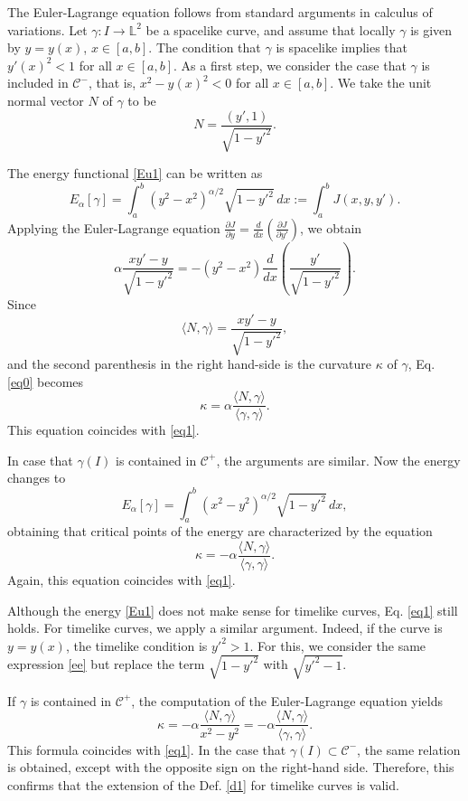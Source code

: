 \documentclass[a4paper,12pt]{amsart}
\theoremstyle{definition}
\def\l{\mathbb L}
\begin{document}
The Euler-Lagrange equation follows from standard arguments in calculus of variations.  Let $\gamma\colon I\to\l^2$ be a spacelike curve, and assume that locally  $\gamma$ is given by $y=y(x)$, $x\in [a,b]$. The condition that $\gamma$ is spacelike implies that $y'(x)^2<1$ for all $x\in [a,b]$. As a first step, we consider the case that $\gamma$ is included in $\mathcal{C}^-$, that is,  $x^2-y(x)^2 <0$ for all $x\in [a,b]$. We take the unit normal vector   $N$ of $\gamma$ to be
\begin{equation}\label{n}
N=\frac{(y',1)}{\sqrt{1-y'^2}}.
\end{equation} 

The energy functional \eqref{Eu1} can be written as
\begin{equation}\label{ee}
E_\alpha[\gamma]=\int_a^b (y^2-x^2)^{\alpha/2}\sqrt{1-y'^2}\, dx:=\int_a^b  J(x,y,y').
\end{equation}
Applying the  Euler-Lagrange equation 
$\frac{\partial J}{\partial y}=\frac{d}{dx}\left(\frac{\partial J}{\partial y'}\right)$,
we obtain
\begin{equation}\label{eq0}
\alpha \frac{xy'-y}{\sqrt{1-y'^2}}=-(y^2-x^2)\frac{d}{dx}\left(\frac{y'}{\sqrt{1-y'^2}}\right).
\end{equation}
Since
$$\langle N,\gamma\rangle=\frac{xy'-y}{\sqrt{1-y'^2}},$$
and the second parenthesis in the right hand-side is the  curvature $\kappa$ of $\gamma$, Eq. \eqref{eq0} becomes
$$\kappa=\alpha\frac{\langle N,\gamma\rangle}{\langle \gamma,\gamma\rangle}.$$
This equation coincides with \eqref{eq1}. 

In case that $\gamma(I)$ is contained in $\mathcal{C}^+$, the arguments are similar. Now the energy changes to
$$E_\alpha[\gamma]=\int_a^b (x^2-y^2)^{\alpha/2}\sqrt{1-y'^2}\, dx,$$
obtaining that critical points of the energy are characterized by the equation
$$\kappa=-\alpha\frac{\langle N,\gamma\rangle}{\langle \gamma,\gamma\rangle}.$$
Again, this equation coincides with  \eqref{eq1}. 

Although the energy \eqref{Eu1} does not make sense for timelike curves, Eq. \eqref{eq1} still holds. For timelike curves, we     apply a similar argument. Indeed,  if the curve is $y=y(x)$, the timelike condition is $y'^2>1$. For this, we consider the same expression \eqref{ee} but replace the term $\sqrt{1-y'^2}$ with $\sqrt{y'^2-1}$. 

If $\gamma$ is contained in $\mathcal{C}^+$, the computation of the Euler-Lagrange equation yields  
$$\kappa=-\alpha\frac{\langle N,\gamma\rangle}{x^2-y^2}=-\alpha\frac{\langle N,\gamma\rangle}{\langle \gamma,\gamma\rangle}.$$
This formula coincides with \eqref{eq1}. In the case that $\gamma(I)\subset \mathcal{C}^-$, the same relation is obtained, except with the opposite sign on the right-hand side. Therefore, this confirms that the extension of the Def. \ref{d1} for timelike curves is valid.
\end{document}
